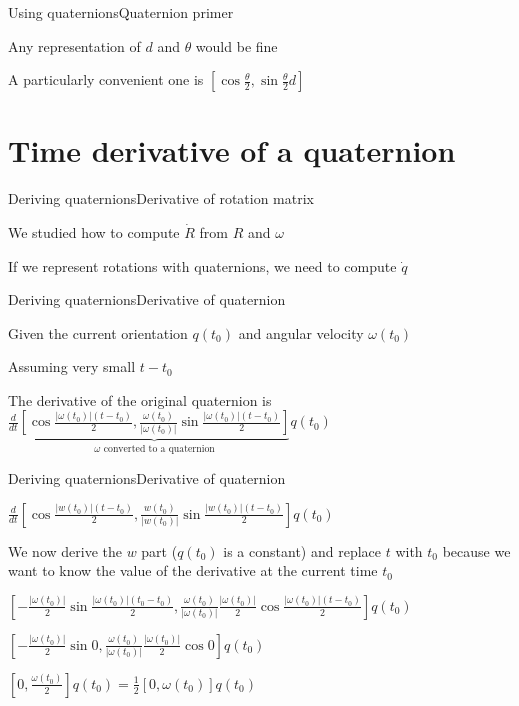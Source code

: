 \documentclass{beamer}
\begin{document}
\begin{slide}{Using quaternions}{Quaternion primer}{
\item Any representation of $d$ and $\theta$ would be fine
\item A particularly convenient one is $[\cos \frac{\theta}{2}, \sin \frac{\theta}{2} d]$
}\end{slide}

\section{Time derivative of a quaternion}
\begin{slide}{Deriving quaternions}{Derivative of rotation matrix}{
\item We studied how to compute $\dot R$ from $R$ and $\omega$
\item If we represent rotations with quaternions, we need to compute $\dot q$
}\end{slide}

\begin{slide}{Deriving quaternions}{Derivative of quaternion}{
\item Given the current orientation $q(t_0)$ and angular velocity $\omega(t_0)$
\item Assuming very small $t-t_0$
\item The derivative of the original quaternion is $\frac{d}{dt}\underbrace{[\cos \frac{|\omega(t_0)|(t-t_0)}{2}, \frac{\omega(t_0)}{|\omega(t_0)|} \sin \frac{|\omega(t_0)|(t-t_0)}{2}]}_{\omega \text{ converted to a quaternion}} q(t_0)$
}\end{slide}

\begin{slide}{Deriving quaternions}{Derivative of quaternion}{
\item $\frac{d}{dt}[\cos \frac{|w(t_0)|(t-t_0)}{2}, \frac{w(t_0)}{|w(t_0)|} \sin \frac{|w(t_0)|(t-t_0)}{2}] q(t_0)$
\item We now derive the $w$ part ($q(t_0)$ is a constant) and replace $t$ with $t_0$ because we want to know the value of the derivative at the current time $t_0$
\item $[-\frac{|\omega(t_0)|}{2} \sin \frac{|\omega(t_0)|(t_0-t_0)}{2}, \frac{\omega(t_0)}{|\omega(t_0)|} \frac{|\omega(t_0)|}{2} \cos \frac{|\omega(t_0)|(t-t_0)}{2}] q(t_0)$
\item $[-\frac{|\omega(t_0)|}{2} \sin 0, \frac{\omega(t_0)}{|\omega(t_0)|} \frac{|\omega(t_0)|}{2} \cos 0] q(t_0)$
\item $[0, \frac{\omega(t_0)}{2}] q(t_0) = \frac{1}{2} [0, \omega(t_0)] q(t_0)$
}\end{slide}
\end{document}
